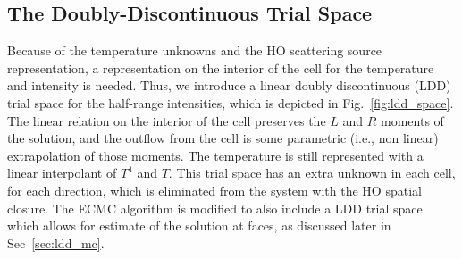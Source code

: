 \subsection{The Doubly-Discontinuous Trial Space}

Because of the temperature unknowns and the HO scattering source representation, a
representation on the interior of the cell for the temperature and intensity is needed.
Thus, we introduce a linear doubly discontinuous (LDD) trial space
for the half-range intensities, which is depicted in Fig.~\ref{fig:ldd_space}.  The linear
relation on the interior of the cell preserves the $L$ and $R$ moments of the solution,
and the outflow from the cell is some parametric (i.e., non linear) extrapolation of
those moments. 
The temperature is still represented with a linear interpolant of $T^4$ and $T$.  This
trial space has an extra unknown in each cell, for each direction, which is eliminated
from the system with the HO spatial closure.  The ECMC algorithm is modified to also
include a LDD trial space which allows for estimate of the solution at faces, as discussed
later in Sec~\ref{sec:ldd_mc}. 



